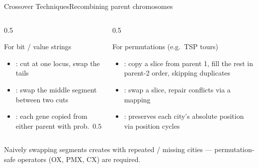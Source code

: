\documentclass[aspectratio=169,11pt]{beamer}
\begin{document}
\begin{frame}{Crossover Techniques}{Recombining parent chromosomes}
  \begin{columns}[T]
    \begin{column}{0.5\textwidth}
      \begin{exampleblock}{For bit / value strings}
        \small
        \begin{itemize}
          \item {}: cut at one locus, swap the tails
          \item {}: swap the middle segment between two cuts
          \item {}: each gene copied from either parent with prob.\ $0.5$
        \end{itemize}
      \end{exampleblock}
    \end{column}
    \begin{column}{0.5\textwidth}
      \begin{alertblock}{For permutations (e.g.\ TSP tours)}
        \small
        \begin{itemize}
          \item {}: copy a slice from parent 1, fill the rest in
            parent-2 order, skipping duplicates
          \item {}: swap a slice, repair conflicts via a mapping
          \item {}: preserves each city's absolute position via
            position cycles
        \end{itemize}
      \end{alertblock}
    \end{column}
  \end{columns}
  \vspace{0.3em}
  \centering\scriptsize
   Naively swapping segments creates
   with repeated / missing cities — permutation-safe operators (OX, PMX, CX)
  are required.
\end{frame}
\end{document}
